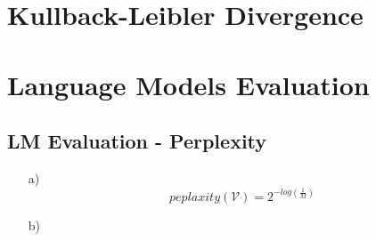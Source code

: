 \documentclass{article}
\begin{document}
\section{Kullback-Leibler Divergence}
\section{Language Models Evaluation}
\subsection{LM Evaluation - Perplexity}
\begin{itemize}
	\item[a)]
		$$peplaxity(\mathcal{V}) = 2^{-log(\frac{1}{M})}$$
	\item[b)]
		
\end{itemize}
\end{document}
